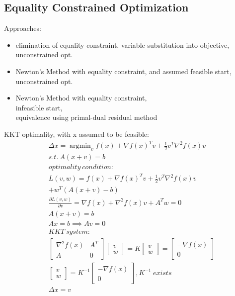 \documentclass[8pt]{extarticle}
\DeclareMathOperator*{\argmin}{argmin}
\begin{document}
\begin{multicols*}{2}
  \section{Equality Constrained Optimization}
  Approaches:
  \begin{itemize}
  \item elimination of equality constraint, variable substitution into objective, unconstrained opt.
  \item Newton's Method with equality constraint, and assumed feasible start, unconstrained opt.
  \item Newton's Method with equality constraint,\\ infeasible start,\\ equivalence using primal-dual residual method
  \end{itemize}  
  KKT optimality, with x assumed to be feasible:
  \begin{align*}
    &\Delta x = \argmin_v f(x) + \nabla f(x)^T v + \frac{1}{2} v^T \nabla^2 f(x) v\\
    &s.t.\ A(x+v)=b\\
    &optimality\ condition:\\
    &L(v,w) = f(x) + \nabla f(x)^T v + \frac{1}{2} v^T \nabla^2 f(x) v\\
    &+ w^T(A(x+v)-b)\\
    &\frac{\partial L(v,w)}{\partial v} = \nabla f(x) + \nabla^2 f(x) v + A^T w = 0\\
    &A(x+v) = b\\
    &Ax = b \implies Av = 0\\
    & KKT\ system:\\
    &\begin{bmatrix}
        \nabla^2 f(x) & A^T \\
        A & 0 
      \end{bmatrix}
      \begin{bmatrix}
        v\\ w
      \end{bmatrix}=
            K
      \begin{bmatrix}
        v\\ w
      \end{bmatrix} =
    \begin{bmatrix}
        -\nabla f(x)\\
        0
      \end{bmatrix}\\
    &\begin{bmatrix}
        v\\ w
      \end{bmatrix} = K^{-1}
      \begin{bmatrix}
        -\nabla f(x)\\
        0
      \end{bmatrix}, K^{-1}\ exists\\
    &\Delta x = v
  \end{align*}
  

\end{multicols*}
\end{document}
